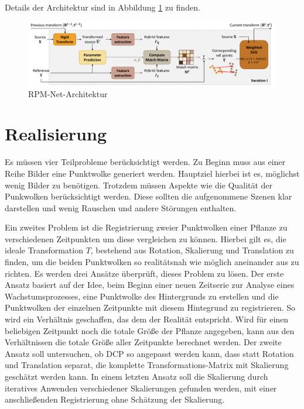 \documentclass[12pt,titlepage, twoside]{article}
\begin{document}
 Details der Architektur sind in Abbildung \ref{fig:rpm:net:arch} zu finden.

\begin{figure}
    \centering
    \includegraphics[width=1.0\textwidth]{./Images/RPM_Net_Arch.png}
    \caption{RPM-Net-Architektur \cite{Yew_2020}}
    \label{fig:rpm:net:arch}
\end{figure}

\newpage
\section{Realisierung}
\label{sec:realisierung}
Es müssen vier Teilprobleme berücksichtigt werden. Zu Beginn muss aus einer Reihe Bilder eine Punktwolke generiert werden. Hauptziel hierbei ist es, möglichst wenig Bilder zu benötigen. 
Trotzdem müssen Aspekte wie die Qualität der Punkwolken berücksichtigt werden. Diese sollten die aufgenommene Szenen klar darstellen und wenig Rauschen und andere Störungen enthalten. 

Ein zweites Problem ist die Registrierung zweier Punktwolken einer Pflanze zu verschiedenen Zeitpunkten um diese vergleichen zu können. 
Hierbei gilt es, die ideale Transformation $T$, bestehend aus Rotation, Skalierung und Translation zu finden, um die beiden Punktwolken so realitätsnah wie möglich aneinander aus zu richten.
Es werden drei Ansätze überprüft, dieses Problem zu lösen. 
Der erste Ansatz basiert auf der Idee, beim Beginn einer neuen Zeitserie zur Analyse eines Wachstumsprozesses, eine Punktwolke des Hintergrunds zu erstellen und die Punktwolken der einzelnen Zeitpunkte mit diesem Hintegrund zu registrieren. 
So wird ein Verhältnis geschaffen, das dem der Realität entspricht. Wird für einen beliebigen Zeitpunkt noch die totale Größe der Pflanze angegeben, kann aus den Verhältnissen die totale Größe aller Zeitpunkte berechnet werden. 
Der zweite Ansatz soll untersuchen, ob DCP so angepasst werden kann, dass statt Rotation und Translation separat, die komplette Transformations-Matrix mit Skalierung geschätzt werden kann.
In einem letzten Ansatz soll die Skalierung durch iteratives Anwenden verschiedener Skalierungen gefunden werden, mit einer anschließenden Registrierung ohne Schätzung der Skalierung.
\end{document}
